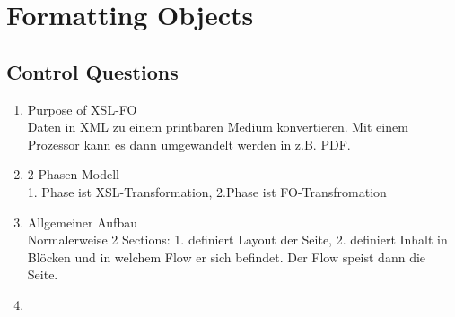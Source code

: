 \chapter{Formatting Objects}



\section{Control Questions}
\begin{enumerate}
\item Purpose of XSL-FO\\
Daten in XML zu einem printbaren Medium konvertieren. Mit einem Prozessor kann es dann umgewandelt werden in z.B. PDF.
\item 2-Phasen Modell\\
1. Phase ist XSL-Transformation, 2.Phase ist FO-Transfromation
\item Allgemeiner Aufbau\\
Normalerweise 2 Sections: 1. definiert Layout der Seite, 2. definiert Inhalt in Blöcken und in welchem Flow er sich befindet. Der Flow speist dann die Seite.
\item 
\end{enumerate}


